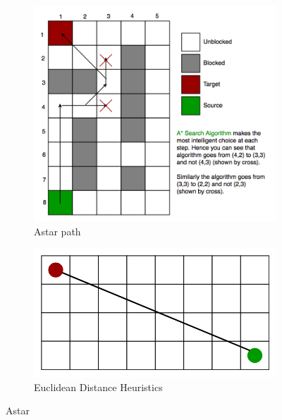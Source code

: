 \documentclass[bibliography=totoc]{scrartcl}
\begin{document}
\begin{figure}[H]
	\centering
	\begin{subfigure}[b]{0.3\linewidth}
		\includegraphics[width=\linewidth]{img/a_-search-algorithm.png}
        \caption{Astar path}	
    \end{subfigure}
	\hspace{0.02\textwidth}
	\begin{subfigure}[b]{0.3\linewidth}
		\includegraphics[width=\linewidth]{img/a_-search-algorithm-euclidian_distance.png}
		\caption{Euclidean Distance Heuristics}
	\end{subfigure}
 	\caption{Astar \cite{Pic:astar}}
	\label{fig:differentenvironments}
\end{figure}
\end{document}
